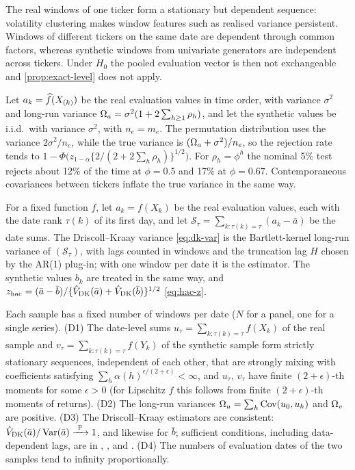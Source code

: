 The real windows of one ticker form a stationary but dependent sequence: volatility clustering
makes window features such as realised variance persistent. Windows of different tickers on the
same date are dependent through common factors, whereas synthetic windows from univariate
generators are independent across tickers. Under $H_0$ the pooled evaluation vector is then not
exchangeable and \cref{prop:exact-level} does not apply.

\begin{remark}\label{rem:naive-perm}
Let $a_k=\widehat{f}(X_{(k)})$ be the real evaluation values in time order, with variance $\sigma^2$ and
long-run variance $\Omega_a=\sigma^2(1+2\sum_{h\ge1}\rho_h)$, and let the synthetic values be
i.i.d.\ with variance $\sigma^2$, with $n_e=m_e$. The permutation distribution uses the variance
$2\sigma^2/n_e$, while the true variance is $(\Omega_a+\sigma^2)/n_e$, so the rejection rate tends
to $1-\Phi\big(z_{1-\alpha}\{2/(2+2\sum_h\rho_h)\}^{1/2}\big)$. For $\rho_h=\phi^h$ the nominal 5\%
test rejects about 12\% of the time at $\phi=0.5$ and 17\% at $\phi=0.67$. Contemporaneous
covariances between tickers inflate the true variance in the same way.
\end{remark}

For a fixed function $f$, let $a_k=f(X_k)$ be the real evaluation values, each with the date rank
$\tau(k)$ of its first day, and let $\mathcal S_\tau=\sum_{k:\tau(k)=\tau}(a_k-\bar a)$ be the
date sums. The Driscoll--Kraay variance \eqref{eq:dk-var} is the Bartlett-kernel long-run variance
of $(\mathcal S_\tau)$, with lags counted in windows and the truncation lag $H$ chosen by the
\citet{andrews1991heteroskedasticity} AR(1) plug-in; with one window per date it is the
\citet{newey1987simple} estimator. The synthetic values $b_k$ are treated in the same way, and
$z_{\mathrm{hac}}=(\bar a-\bar b)/\{\hat V_{\mathrm{DK}}(\bar a)+\hat V_{\mathrm{DK}}(\bar b)\}^{1/2}$
\eqref{eq:hac-z}.

\begin{assumption}\label{ass:mixing}
Each sample has a fixed number of windows per date ($N$ for a panel, one for a single series).
(D1) The date-level sums $u_\tau=\sum_{k:\tau(k)=\tau}f(X_k)$ of the real sample and
$v_\tau=\sum_{k:\tau(k)=\tau}f(Y_k)$ of the synthetic sample form strictly stationary sequences,
independent of each other, that are strongly mixing with coefficients satisfying
$\sum_h\alpha(h)^{\epsilon/(2+\epsilon)}<\infty$, and $u_\tau$, $v_\tau$ have finite
$(2+\epsilon)$-th moments for some $\epsilon>0$ (for Lipschitz $f$ this follows from finite
$(2+\epsilon)$-th moments of returns). (D2) The long-run variances $\Omega_u=\sum_h\operatorname{Cov}(u_0,u_h)$
and $\Omega_v$ are positive. (D3) The Driscoll--Kraay estimators are consistent:
$\hat V_{\mathrm{DK}}(\bar a)/\operatorname{Var}(\bar a)\xrightarrow{\ \mathbb{P}\ }1$, and likewise for $\bar b$; sufficient conditions,
including data-dependent lags, are in \citet{andrews1991heteroskedasticity},
\citet{newey1987simple}, \citet{driscoll1998consistent} and \citet{dejong_2000_consistency}.
(D4) The numbers of evaluation dates of the two samples tend to infinity proportionally.
\end{assumption}

